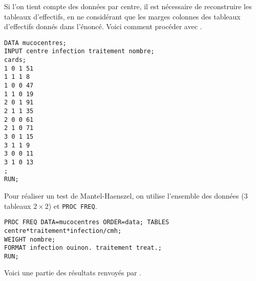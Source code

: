 Si l'on tient compte des données par centre, il est nécessaire de
reconstruire les tableaux d'effectifs, en ne considérant que les marges
colonnes des tableaux d'effectifs donnés dans l'énoncé. Voici comment
procéder avec \SAS.
\begin{verbatim}
DATA mucocentres;
INPUT centre infection traitement nombre;
cards;
1 0 1 51
1 1 1 8
1 0 0 47
1 1 0 19
2 0 1 91
2 1 1 35
2 0 0 61
2 1 0 71
3 0 1 15
3 1 1 9
3 0 0 11
3 1 0 13
;
RUN;
\end{verbatim}

Pour réaliser un test de Mantel-Haenszel, on utilise l'ensemble des données
(3 tableaux $2\times 2$) et \texttt{PROC FREQ}.
\begin{verbatim}
PROC FREQ DATA=mucocentres ORDER=data; TABLES centre*traitement*infection/cmh;
WEIGHT nombre;
FORMAT infection ouinon. traitement treat.;
RUN;
\end{verbatim}
Voici une partie des résultats renvoyés par \SAS.
